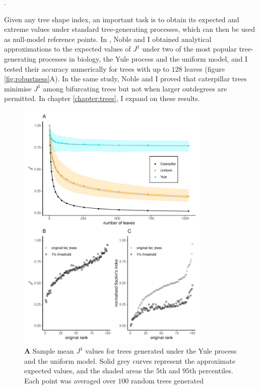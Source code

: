 \cite{noble_spatial_2022}. \par
Given any tree shape index, an important task is to obtain its expected and
extreme values under standard tree-generating processes, which can then be used
as null-model reference points. In \cite{lemant_robust_2022}, Noble and I
obtained analytical approximations to the expected values of $J^1$ under two of
the most popular tree-generating processes in biology, the Yule process and the
uniform model, and I tested their accuracy numerically for trees with up to
$128$ leaves (figure \ref{fig:robustness}A). In the same study, Noble and I
proved that caterpillar trees minimise $J^1$ among bifurcating trees but not
when larger outdegrees are permitted. In chapter \ref{chapter:trees}, I expand
on these results.

\begin{figure}[h]
    \centering
    \includegraphics[width=0.82\textwidth]{Chapter_1/figures/old_j1_paper_figure.pdf}
    \caption{\textbf{A} Sample mean $J^1$ values for trees generated under the
    Yule process and the uniform model. Solid grey curves represent the
    approximate expected values, and the shaded areas the $5$th and $95$th
    percentiles. Each point was averaged over $100$ random trees generated
}
\end{figure}
